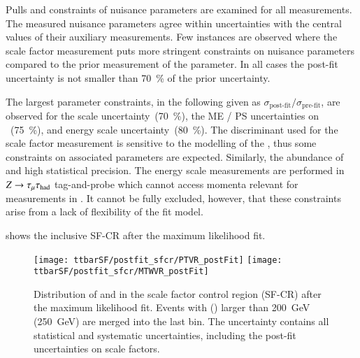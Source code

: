 Pulls and constraints of nuisance parameters are examined for all
measurements. The measured nuisance parameters agree
within uncertainties with the central values of their auxiliary
measurements. Few instances are observed where the scale factor
measurement puts more stringent constraints on nuisance parameters
compared to the prior measurement of the parameter. In all cases the
post-fit uncertainty is not smaller than \SI{70}{\percent} of the
prior uncertainty.

The largest parameter constraints, in the following given as
$\sigma_\text{post-fit} / \sigma_\text{pre-fit}$, are observed for the
\pTmissAbs scale uncertainty~(\SI{70}{\percent}), the ME / PS
uncertainties on \ttbar~(\SI{75}{\percent}), and \tauhadvis energy
scale uncertainty~(\SI{80}{\percent}). The \mTW discriminant used for
the scale factor measurement is sensitive to the modelling of the
\pTmissAbs, thus some constraints on associated parameters are
expected. Similarly, the abundance of \ttbar and high statistical
precision. The \tauhadvis energy scale measurements are
performed in $Z \rightarrow \tau_{\mu} \tau_{\text{had}}$ tag-and-probe
which cannot access \tauhadvis momenta relevant for measurements in
\ttbar.  It cannot be fully excluded, however, that these constraints
arise from a lack of flexibility of the fit model.

 shows the inclusive SF-CR after the
maximum likelihood fit.


\begin{figure}[htbp]
  \centering

  \texttt{[image: ttbarSF/postfit\_sfcr/PTVR\_postFit]}
  \texttt{[image: ttbarSF/postfit\_sfcr/MTWVR\_postFit]}

  \caption{Distribution of \tauhadvis \pT and \mTW in the scale factor
    control region (SF-CR) after the maximum likelihood fit. Events
    with \tauhadvis \pT (\mTW) larger than \SI{200}{\GeV}
    (\SI{250}{\GeV}) are merged into the last bin. The uncertainty
    contains all statistical and systematic uncertainties, including
    the post-fit uncertainties on scale factors.}
  \label{fig:ttbarSF_postfit_ptmtw}
\end{figure}


